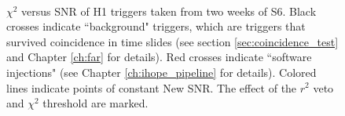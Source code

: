 \begin{figure}
\label{fig:snr_chisq}
\begin{center}
 \\
\end{center}
\caption{$\chi^2$ versus \ac{SNR} of H1 triggers taken from two weeks of \ac{S6}. Black crosses indicate ``background" triggers, which are triggers that survived coincidence in time slides (see section \ref{sec:coincidence_test} and Chapter \ref{ch:far} for details). Red crosses indicate ``software injections" (see Chapter \ref{ch:ihope_pipeline} for details). Colored lines indicate points of constant New \ac{SNR}. The effect of the $r^2$ veto and $\chi^2$ threshold are marked.}
\end{figure}
